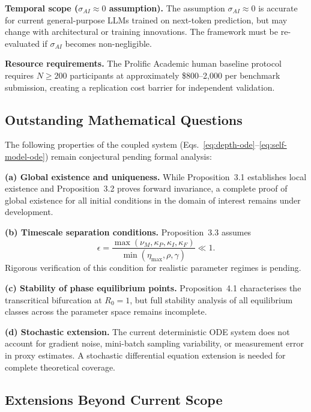 \documentclass[11pt,a4paper]{article}
\begin{document}
\textbf{Temporal scope ($\sigma_{AI} \approx 0$ assumption).}
The assumption $\sigma_{AI} \approx 0$ is accurate for current
general-purpose LLMs trained on next-token prediction, but may change
with architectural or training innovations. The framework must be
re-evaluated if $\sigma_{AI}$ becomes non-negligible.

\textbf{Resource requirements.} The Prolific Academic human baseline
protocol requires $N \geq 200$ participants at approximately
\$800--2,000 per benchmark submission, creating a replication cost
barrier for independent validation.

\subsection{Outstanding Mathematical Questions}\label{sec:open-questions}

The following properties of the coupled system (Eqs.~\eqref{eq:depth-ode}--\eqref{eq:self-model-ode})
remain conjectural pending formal analysis:

\textbf{(a) Global existence and uniqueness.} While Proposition~3.1
establishes local existence and Proposition~3.2 proves forward invariance,
a complete proof of global existence for all initial conditions in the
domain of interest remains under development.

\textbf{(b) Timescale separation conditions.} Proposition~3.3 assumes
\begin{equation*}
\epsilon = \frac{\max(\nu_M, \kappa_P, \kappa_I, \kappa_F)}{\min(\eta_{\max}, \rho, \gamma)} \ll 1.
\end{equation*}
Rigorous verification of this condition for realistic parameter regimes
is pending.

\textbf{(c) Stability of phase equilibrium points.} Proposition~4.1
characterises the transcritical bifurcation at $R_0 = 1$, but full
stability analysis of all equilibrium classes across the parameter space
remains incomplete.

\textbf{(d) Stochastic extension.} The current deterministic ODE system
does not account for gradient noise, mini-batch sampling variability,
or measurement error in proxy estimates. A stochastic differential
equation extension is needed for complete theoretical coverage.

\subsection{Extensions Beyond Current Scope}\label{sec:extensions}
\end{document}
